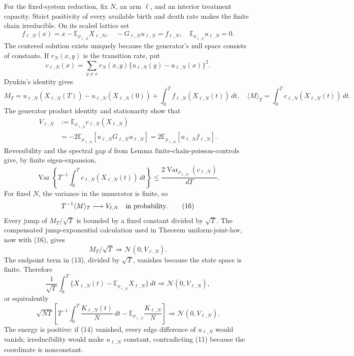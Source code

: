 For the fixed-system reduction, fix \(N\), an arm \(\ell\), and an interior treatment capacity.  Strict positivity of every available birth and death rate makes the finite chain irreducible.  On its scaled lattice set
\[
 f_{\ell,N}(x)=x-\mathbb E_{\rho_{\ell,N}}X_{\ell,N},
 \quad
 -G_{\ell,N}u_{\ell,N}=f_{\ell,N},
 \quad
 \mathbb E_{\rho_{\ell,N}}u_{\ell,N}=0.                     \tag{11}
\]
The centered solution exists uniquely because the generator's null space consists of constants.  If \(r_N(x,y)\) is the transition rate, put
\[
 c_{\ell,N}(x)=\sum_{y\ne x}r_N(x,y)
 \{u_{\ell,N}(y)-u_{\ell,N}(x)\}^2.                          \tag{12}
\]
Dynkin's identity gives
\[
 M_T=u_{\ell,N}(X_{\ell,N}(T))-u_{\ell,N}(X_{\ell,N}(0))
 +\int_0^Tf_{\ell,N}(X_{\ell,N}(t))\,dt,
 \quad
 \langle M\rangle_T=\int_0^Tc_{\ell,N}(X_{\ell,N}(t))\,dt. \tag{13}
\]
The generator product identity and stationarity show that
\[
 \begin{split}
 V_{\ell,N}
 &:=\mathbb E_{\rho_{\ell,N}}c_{\ell,N}(X_{\ell,N})\\
 &=-2\mathbb E_{\rho_{\ell,N}}
   [u_{\ell,N}G_{\ell,N}u_{\ell,N}]
 =2\mathbb E_{\rho_{\ell,N}}[u_{\ell,N}f_{\ell,N}].         \tag{14}
 \end{split}
\]
Reversibility and the spectral gap \(d\) from Lemma \(\mathrm{finite\mbox{-}chain\mbox{-}poisson\mbox{-}controls}\) give, by finite eigen-expansion,
\[
 \operatorname{Var}\!\left\{T^{-1}\int_0^T c_{\ell,N}(X_{\ell,N}(t))\,dt\right\}
 \leq\frac{2\operatorname{Var}_{\rho_{\ell,N}}(c_{\ell,N})}{dT}. \tag{15}
\]
For fixed \(N\), the variance in the numerator is finite, so
\[
 T^{-1}\langle M\rangle_T\longrightarrow V_{\ell,N}
 \quad\hbox{in probability}.                                  \tag{16}
\]
Every jump of \(M_T/\sqrt T\) is bounded by a fixed constant divided by \(\sqrt T\).  The compensated jump-exponential calculation used in Theorem \(\mathrm{uniform\mbox{-}joint\mbox{-}law}\), now with (16), gives
\[
 M_T/\sqrt T\Rightarrow\mathcal N(0,V_{\ell,N}).             \tag{17}
\]
The endpoint term in (13), divided by \(\sqrt T\), vanishes because the state space is finite.  Therefore
\[
 \frac1{\sqrt T}\int_0^T
 \{X_{\ell,N}(t)-\mathbb E_{\rho_{\ell,N}}X_{\ell,N}\}\,dt
 \Rightarrow\mathcal N(0,V_{\ell,N}),                        \tag{18}
\]
or equivalently
\[
 \sqrt{NT}\left[
 T^{-1}\int_0^T\frac{K_{\ell,N}(t)}N\,dt
 -\mathbb E_{\rho_{\ell,N}}\frac{K_{\ell,N}}N\right]
 \Rightarrow\mathcal N(0,V_{\ell,N}).                        \tag{19}
\]
The energy is positive: if (14) vanished, every edge difference of \(u_{\ell,N}\) would vanish; irreducibility would make \(u_{\ell,N}\) constant, contradicting (11) because the coordinate is nonconstant.

